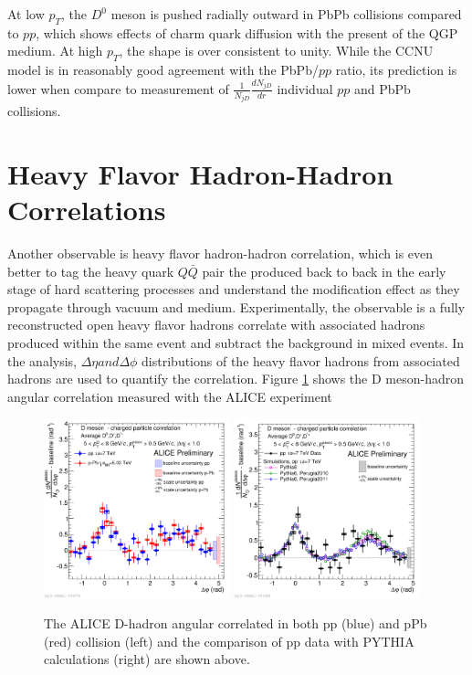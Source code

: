 At low $p_T$, the $D^0$ meson is pushed radially outward in PbPb collisions compared to $pp$, which shows effects of charm quark diffusion with the present of the QGP medium. At high $p_T$, the shape is over consistent to unity. While the CCNU model is in reasonably good agreement with the PbPb/$pp$ ratio, its prediction is lower when compare to measurement of $\frac{1}{N_{jD}}\frac{dN_{jD}}{dr}$ individual $pp$ and PbPb collisions.


\section{Heavy Flavor Hadron-Hadron Correlations}

Another observable is heavy flavor hadron-hadron correlation, which is even better to tag the heavy quark $Q\bar Q$ pair the produced back to back in the early stage of hard scattering processes and understand the modification effect as they propagate through vacuum and medium. Experimentally, the observable is a fully reconstructed open heavy flavor hadrons correlate with associated hadrons produced within the same event and subtract the background in mixed events. In the analysis, $\Delta \eta and \Delta \phi$ distributions of the heavy flavor hadrons from associated hadrons are used to quantify the correlation. Figure \ref{ALICEDHadron} shows the D meson-hadron angular correlation measured with the ALICE experiment \cite{DHadronRef}


\begin{figure}[hbtp]
\begin{center}
\includegraphics[width=0.48\textwidth]{Figures/Chapter2/ALICEDHadron.png}
\includegraphics[width=0.48\textwidth]{Figures/Chapter2/ALICEDHadronPP.png}
\caption{The ALICE D-hadron angular correlated in both pp (blue) and pPb (red) collision (left) and the comparison of pp data with PYTHIA calculations (right) are shown above.}
\label{ALICEDHadron}
\end{center}
\end{figure}   

